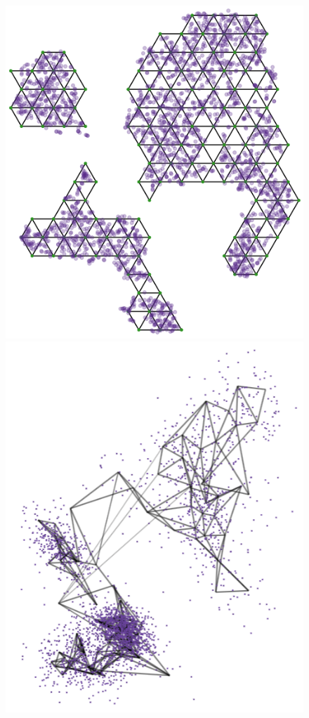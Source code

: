 \documentclass[
  12pt]{article}
\begin{document}
\begin{figure}[H]

\begin{minipage}{0.25\linewidth}
\includegraphics{figures/pbmc3k/tsne_trimesh_plot.png}\end{minipage}%
%
\begin{minipage}{0.25\linewidth}
\includegraphics{figures/pbmc3k/sc_4.png}\end{minipage}%

\end{figure}
\end{document}

